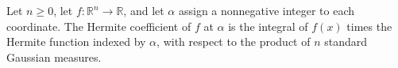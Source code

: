 \begin{definition}
\label{BooleanAnalysis.GaussianSpace.hermiteCoeff}
\leanok
{}
Let $n\ge 0$, let $f:\mathbb R^n\to\mathbb R$, and let $\alpha$ assign a nonnegative
integer to each coordinate. The Hermite coefficient of $f$ at $\alpha$ is the integral
of $f(x)$ times the Hermite function indexed by $\alpha$, with respect to the product of
$n$ standard Gaussian measures.
\end{definition}
